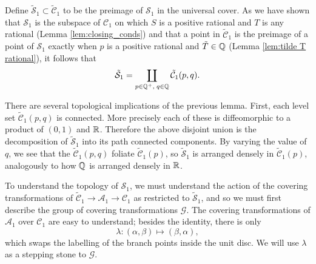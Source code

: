Define $\mathcal{\tilde{S}}_1 \subset \mathcal{\tilde{C}}_1$ to be the preimage of $\mathcal{S}_1$ in the universal cover. As we have shown that $\mathcal{S}_1$ is the subspace of $\mathcal{C}_1$ on which $S$ is a positive rational and $T$ is any rational (Lemma \ref{lem:closing_conds}) and that a point in $\mathcal{\tilde{C}}_1$ is the preimage of a point of $\mathcal{S}_1$ exactly when $p$ is a positive rational and $\tilde{T} \in \Q$ (Lemma \ref{lem:tilde T rational}), it follows that
\[
\mathcal{\tilde{S}}_1 = \coprod_{p\in \Q^+,\; q\in \Q} \mathcal{\tilde{C}}_1(p,q).
\]

There are several topological implications of the previous lemma. First, each level set $\mathcal{\tilde{C}}_1(p,q)$ is connected. More precisely each of these is diffeomorphic to a product of $(0,1)$ and $\R$. Therefore the above disjoint union is the decomposition of $\mathcal{\tilde{S}}_1$ into its path connected components. By varying the value of $q$, we see that the $\mathcal{\tilde{C}}_1(p,q)$ foliate $\mathcal{\tilde{C}}_1(p)$, so $\mathcal{\tilde{S}}_1$ is arranged densely in $\mathcal{\tilde{C}}_1(p)$, analogously to how $\Q$ is arranged densely in $\R$.

To understand the topology of $\mathcal{S}_1$, we must understand the action of the covering transformations of $\mathcal{\tilde{C}}_1 \to \mathcal{A}_1 \to \mathcal{C}_1$ as restricted to $\tilde{\mathcal{S}}_1$, and so we must first describe the group of covering transformations $\mathcal{G}$. The covering transformations of $\mathcal{A}_1$ over $\mathcal{C}_1$ are easy to understand; besides the identity, there is only
\[
λ : (α,β) \mapsto (β,α),
\]
which swaps the labelling of the branch points inside the unit disc. We will use $λ$ as a stepping stone to $\mathcal{G}$.


